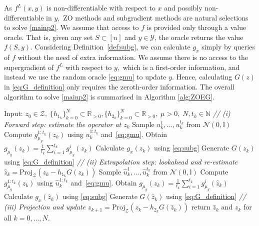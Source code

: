 \documentclass{article}
\theoremstyle{plain}
\theoremstyle{definition}
\theoremstyle{remark}
\begin{document}
As $f^L(x,y)$ is non-differentiable with respect to $x$ and possibly non-differentiable in $y,$ ZO methods and subgradient methods are natural selections to solve \eqref{mainp2}.
We assume that access to $f$ is provided only through a value oracle. That is, given any set $S \subset [n]$ and $y\in\mathcal{Y}$, the oracle returns the value $f(S,y)$.
Considering Definition~\ref{def:subg}, we can calculate $g_x$ simply by queries of $f$ without the need of extra information. 
We assume there is no access to the supergradient of $f^L$ with respect to $y,$ which is a first-order information, and instead %
we use the random oracle \eqref{eq:gmu} to update %
$y.$ %
Hence, calculating $G(z)$ in \eqref{eq:G_definition} only requires %
the zeroth-order information. 
The overall algorithm to solve \eqref{mainp2} is summarised in Algorithm \ref{alg:ZOEG}.
\begin{algorithm}[tb]
	\caption{ZO-EG}\label{alg:ZOEG}
	\begin{algorithmic}[1]
		\STATE Input: $z_0\in\mathcal{Z},\;\{h_{1_k}\}_{k=0}^N\subset \mathbb{R}_{>0},\{h_{2_k}\}_{k=0}^N\subset \mathbb{R}_{>0},\;\mu>0,\;N,t_k\in\mathbb{N}$
            \STATE \textit{// (i) Forward step: estimate the operator at $z_k$}
		\STATE Sample $u_k^1, \dots, u_k^{t_k}$ from $\mathcal{N}(0, \mathbb{I})$
            \STATE Compute $g_{\mu_y}^{1:t_k}(z_k)$ using $u_k^{1:t_k}$ and~\eqref{eq:gmu}.
            \STATE Obtain $g_{\mu_y}(z_k) = \frac{1}{t_k} \sum_{i=1}^{t_k} g_{\mu_y}^i(z_k)$ \label{line:5}
            \STATE Calculate $g_x(z_k)$ using \eqref{eq:subg}
            \STATE Generate $G(z_k)$ using \eqref{eq:G_definition}
            \STATE \textit{// (ii) Extrapolation step: lookahead and re-estimate}
		\STATE $\hat{z}_{k} = \mathrm{Proj}_{\mathcal{Z}}(z_k - h_{1_k}G(z_k))$            \label{line:8}
            \STATE Sample $\hat{u}_k^1, \dots, \hat{u}_k^{t_k}$ from $\mathcal{N}(0, \mathbb{I})$
            \STATE Compute $g_{\mu_y}^{1:t_k}(\hat{z}_k)$ using $\hat{u}_k^{1:t_k}$ and~\eqref{eq:gmu}.
            \STATE Obtain $g_{\mu_y}(\hat{z}_k) = \frac{1}{t_k} \sum_{i=1}^{t_k} g_{\mu_y}^i(\hat{z}_k)$ \label{line:11}
            \STATE Calculate $g_x(\hat{z}_k)$ using \eqref{eq:subg}
            \STATE Generate $G(\hat{z}_k)$ using \eqref{eq:G_definition}
            \STATE \textit{// (iii) Projection and update}
		\STATE $z_{k+1} = \mathrm{Proj}_{\mathcal{Z}}(z_k - h_{2_k}G(\hat{z}_k))$            \label{line:14}
		\ENDFOR
		\STATE return $\hat{z}_k$ and $z_k$ for all $k = 0,\dots, N.$
	\end{algorithmic}
\end{algorithm}
\end{document}
